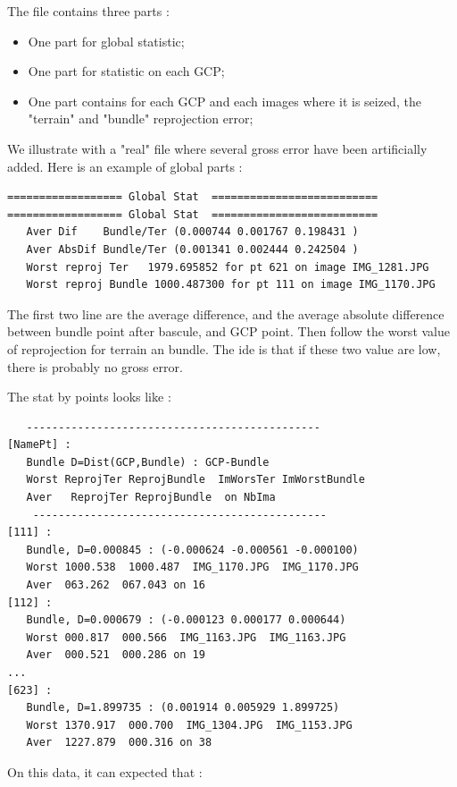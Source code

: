 The file contains three parts :

\begin{itemize}
   \item One part for global statistic;

   \item One part for statistic on each GCP;

   \item One part contains for each GCP and each images where it is seized, the "terrain" and "bundle" 
         reprojection error;
\end{itemize}


We illustrate with a "real" file  where several gross error have been artificially added.
Here is an example of global parts :


\begin{verbatim}
================== Global Stat  ==========================
================== Global Stat  ==========================
   Aver Dif    Bundle/Ter (0.000744 0.001767 0.198431 )
   Aver AbsDif Bundle/Ter (0.001341 0.002444 0.242504 )
   Worst reproj Ter   1979.695852 for pt 621 on image IMG_1281.JPG
   Worst reproj Bundle 1000.487300 for pt 111 on image IMG_1170.JPG
\end{verbatim}

The first two line are the average difference, and the average absolute difference between
bundle point after bascule, and GCP point. Then follow the worst value of reprojection
for terrain an bundle. The ide is  that if these two value are low, there is probably
no gross error.

The stat by points looks like :


\begin{verbatim}
   ----------------------------------------------
[NamePt] :
   Bundle D=Dist(GCP,Bundle) : GCP-Bundle
   Worst ReprojTer ReprojBundle  ImWorsTer ImWorstBundle
   Aver   ReprojTer ReprojBundle  on NbIma
    ----------------------------------------------
[111] :
   Bundle, D=0.000845 : (-0.000624 -0.000561 -0.000100)
   Worst 1000.538  1000.487  IMG_1170.JPG  IMG_1170.JPG
   Aver  063.262  067.043 on 16
[112] :
   Bundle, D=0.000679 : (-0.000123 0.000177 0.000644)
   Worst 000.817  000.566  IMG_1163.JPG  IMG_1163.JPG
   Aver  000.521  000.286 on 19
...
[623] :
   Bundle, D=1.899735 : (0.001914 0.005929 1.899725)
   Worst 1370.917  000.700  IMG_1304.JPG  IMG_1153.JPG
   Aver  1227.879  000.316 on 38
\end{verbatim}


On this data, it can expected that :

